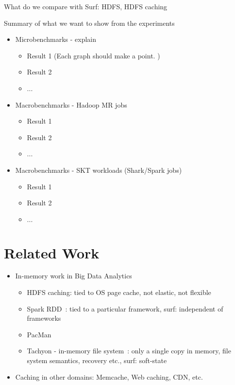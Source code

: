 \documentclass[twocolumn,10pt]{article}
\begin{document}
\noindent What do we compare with Surf: HDFS, HDFS caching

\noindent Summary of what we want to show from the experiments

\begin{itemize}
\item Microbenchmarks - explain
\begin{itemize}
\item Result 1 (Each graph should make a point. )
\item Result 2 
\item ...
\end{itemize}

\item Macrobenchmarks - Hadoop MR jobs
\begin{itemize}
\item Result 1
\item Result 2
\item ...
\end{itemize}

\item Macrobenchmarks - SKT workloads (Shark/Spark jobs)  
\begin{itemize}
\item Result 1
\item Result 2
\item ...
\end{itemize}

\end{itemize}

\section{Related Work}

\begin{itemize}
\item In-memory work in Big Data Analytics
\begin{itemize}
\item HDFS caching: tied to OS page cache, not elastic, not flexible
\item Spark RDD~\cite{sparknsdi}: tied to a particular framework, surf: independent of frameworks
\item PacMan~\cite{pacman}
\item Tachyon - in-memory file system~\cite{tachyon}: only a single copy in memory, file system semantics, recovery etc., surf: soft-state
\end{itemize}
\item Caching in other domains: Memcache, Web caching, CDN, etc.
\end{itemize}
\end{document}
